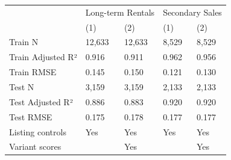 \begin{tabular}{lllll}
\toprule
 & \multicolumn{2}{r}{Long-term Rentals} & \multicolumn{2}{r}{Secondary Sales} \\
 & (1) & (2) & (1) & (2) \\
\midrule
Train N & 12,633 & 12,633 & 8,529 & 8,529 \\
Train Adjusted R² & 0.916 & 0.911 & 0.962 & 0.956 \\
Train RMSE & 0.145 & 0.150 & 0.121 & 0.130 \\
Test N & 3,159 & 3,159 & 2,133 & 2,133 \\
Test Adjusted R² & 0.886 & 0.883 & 0.920 & 0.920 \\
Test RMSE & 0.175 & 0.178 & 0.177 & 0.177 \\
Listing controls & Yes & Yes & Yes & Yes \\
Variant scores &  & Yes &  & Yes \\
\bottomrule
\end{tabular}
